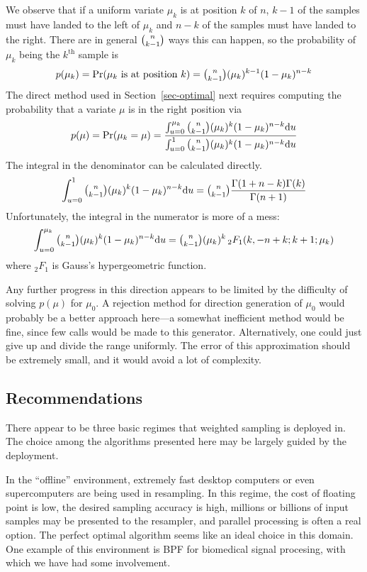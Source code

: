 \documentclass[12pt]{article}
\newcommand{\hyperg}{{{{}_2}{F_1}}}
\newcommand{\du}{{\text{d}u}}
\begin{document}
  We observe that if a uniform variate $\mu_k$ is at
  position $k$ of $n$, $k - 1$ of the samples must have landed to the
  left of $\mu_k$ and $n - k$ of the samples must have
  landed to the right.  There are in general $\tbinom{n}{k-1}$
  ways this can happen, so the probability of $\mu_k$ being
  the $k^{\text{th}}$ sample is $$
    p(\mu_k) = \text{Pr}(\mu_k\text{ is at position }k) =
         \tbinom{n}{k - 1}(\mu_k)^{k-1}(1-\mu_k)^{n - k}
  $$
  The direct method used in Section~\ref{sec-optimal}
  next requires computing the probability that a variate
  $\mu$ is in the right position via $$
    p(\mu) = \text{Pr}(\mu_k = \mu) =
      \frac{\int_{u=0}^{\mu_k}{\tbinom{n}{k - 1}(\mu_k)^k(1-\mu_k)^{n - k}}\du}
           {\int_{u=0}^{1}{\tbinom{n}{k - 1}(\mu_k)^k(1-\mu_k)^{n - k}}\du}
  $$
  The integral in the denominator can be calculated
  directly. $$
    \int_{u=0}^{1}{\tbinom{n}{k - 1}(\mu_k)^k(1-\mu_k)^{n - k}}\du = 
        \tbinom{n}{k - 1}\frac{\Gamma(1 + n - k)\Gamma(k)}{\Gamma(n + 1)}
  $$
  Unfortunately, the integral in the numerator is more of a
  mess: $$
    \int_{u=0}^{\mu_k}{\tbinom{n}{k - 1}(\mu_k)^k(1-\mu_k)^{n - k}}\du =
        \tbinom{n}{k - 1}(\mu_k)^k\,\hyperg(k, -n + k; k + 1; \mu_k)
  $$
  where $\hyperg$ is Gauss's hypergeometric function.

  Any further progress in this direction appears to be
  limited by the difficulty of solving $p(\mu)$
  for $\mu_0$.  A rejection method for direction generation
  of $\mu_0$ would probably be a better approach here---a
  somewhat inefficient method would be fine, since few calls
  would be made to this generator.  Alternatively, one could
  just give up and divide the range uniformly.  The error of
  this approximation should be extremely small, and it would
  avoid a lot of complexity.
  
\subsection{Recommendations}

  There appear to be three basic regimes that weighted
  sampling is deployed in.  The choice among the algorithms
  presented here may be largely guided by the deployment.

  In the ``offline'' environment, extremely fast desktop
  computers or even supercomputers are being used in
  resampling.  In this regime, the cost of floating point is
  low, the desired sampling accuracy is high, millions or
  billions of input samples may be presented to the
  resampler, and parallel processing is often a real option.
  The perfect optimal algorithm seems like an ideal choice
  in this domain.  One example of this environment is BPF
  for biomedical signal procesing, with which we have had
  some involvement.
\end{document}
